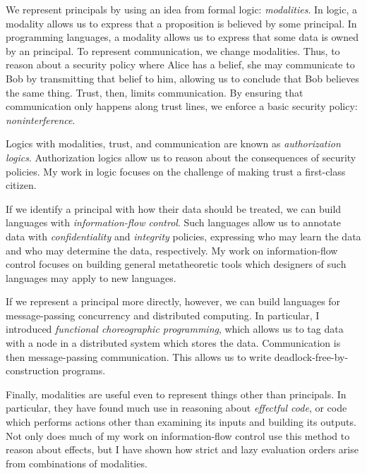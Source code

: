 \documentclass{article}
\theoremstyle{definition}
\begin{document}
We represent principals by using an idea from formal logic: \emph{modalities}.
In logic, a modality allows us to express that a proposition is believed by some principal.
In programming languages, a modality allows us to express that some data is owned by an principal.
To represent communication, we change modalities.
Thus, to reason about a security policy where Alice has a belief, she may communicate to Bob by transmitting that belief to him, allowing us to conclude that Bob believes the same thing.
Trust, then, limits communication.
By ensuring that communication only happens along trust lines, we enforce a basic security policy: \emph{noninterference}.

Logics with modalities, trust, and communication are known as \emph{authorization logics}.
Authorization logics allow us to reason about the consequences of security policies.
My work in logic focuses on the challenge of making trust a first-class citizen.

If we identify a principal with how their data should be treated, we can build languages with \emph{information-flow control}.
Such languages allow us to annotate data with \emph{confidentiality} and \emph{integrity} policies, expressing who may learn the data and who may determine the data, respectively.
My work on information-flow control focuses on building general metatheoretic tools which designers of such languages may apply to new languages.

If we represent a principal more directly, however, we can build languages for message-passing concurrency and distributed computing.
In particular, I introduced \emph{functional choreographic programming}, which allows us to tag data with a node in a distributed system which stores the data.
Communication is then message-passing communication.
This allows us to write deadlock-free-by-construction programs.

Finally, modalities are useful even to represent things other than principals.
In particular, they have found much use in reasoning about \emph{effectful code}, or code which performs actions other than examining its inputs and building its outputs.
Not only does much of my work on information-flow control use this method to reason about effects, but I have shown how strict and lazy evaluation orders arise from combinations of modalities.
\fi


\end{document}
